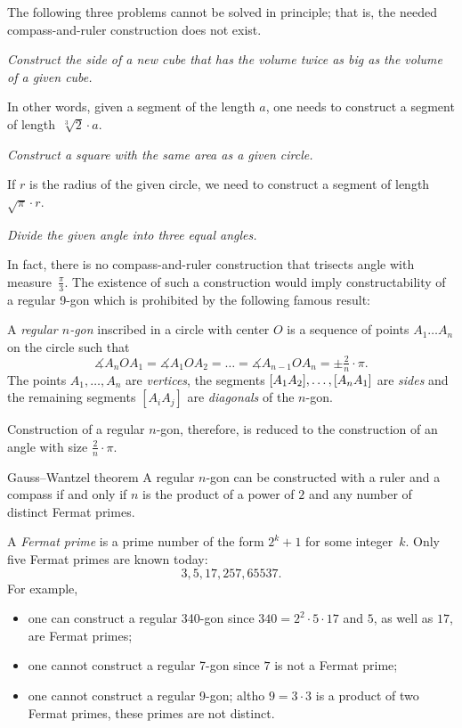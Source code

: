 The following three problems cannot be solved in principle; 
that is, the needed compass-and-ruler construction does not exist.



 {\it Construct the side of a new cube 
that has the volume twice as big as the volume of a given cube.} 

\medskip

In other words, 
given a segment of the length $a$,
one needs to construct a segment of length~$\sqrt[3]{2}\cdot a$.

 {\it Construct a square with the same area as a given circle.} 

\medskip

If $r$ is the radius of the given circle, we need to construct a segment of length~$\sqrt{\pi}\cdot r$. 

{\it Divide the given angle into three equal angles.}

\medskip

In fact, there is no compass-and-ruler construction that trisects angle with measure~$\tfrac\pi3$. 
The existence of such a construction would imply constructability of a regular 9-gon which is prohibited by the following famous result:

A \emph{regular $n$-gon} inscribed in a circle with center $O$ is a sequence of points $A_1\dots A_n$ on the circle such that 
\[\measuredangle A_nOA_1=\measuredangle A_1OA_2=\dots=\measuredangle A_{n-1}OA_n=\pm\tfrac2n\cdot \pi.\]
The points $A_1,\dots, A_n$ are \emph{vertices},
the segments $[A_1A_2], \z\dots, [A_nA_1]$ are \emph{sides} 
and the remaining segments $[A_iA_j]$ are \emph{diagonals} of the $n$-gon.

Construction of a regular $n$-gon, therefore, is reduced to the construction of an angle with size $\tfrac2n\cdot \pi$.

\begin{thm}{Gauss--Wantzel theorem}
A regular $n$-gon can be constructed with a ruler and a compass 
if and only if 
$n$ is the product of a power of $2$ and any number of distinct Fermat primes.
\end{thm}

A \emph{Fermat prime} is a prime number of the form $2^k+1$ for some integer~$k$.
Only five Fermat primes are known  today:
$$3, 5, 17, 257, 65537.$$
For example, 
\begin{itemize}
\item one can construct a regular 340-gon since $340=2^2\cdot 5\cdot 17$ and $5$, as well as $17$, are Fermat primes;
\item one cannot construct a regular 7-gon since $7$ is not a Fermat prime;
\item one cannot construct a regular 9-gon; 
altho $9=3\cdot 3$ is a product of two Fermat primes, 
these primes are not distinct.
\end{itemize}

